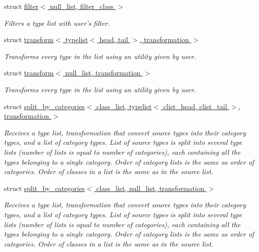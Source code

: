 \begin{DoxyCompactItemize}
struct \hyperlink{structavrpp_1_1typelist_1_1filter_3_01null__list_00_01filter__class_01_4}{filter$<$ null\_\-list, filter\_\-class $>$}
\begin{DoxyCompactList}\small\item\em Filters a type list with user's filter. \item\end{DoxyCompactList}\item 
struct \hyperlink{structavrpp_1_1typelist_1_1transform_3_01typelist_3_01head_00_01tail_01_4_00_01transformation_01_4}{transform$<$ typelist$<$ head, tail $>$, transformation $>$}
\begin{DoxyCompactList}\small\item\em Transforms every type in the list using an utility given by user. \item\end{DoxyCompactList}\item 
struct \hyperlink{structavrpp_1_1typelist_1_1transform_3_01null__list_00_01transformation_01_4}{transform$<$ null\_\-list, transformation $>$}
\begin{DoxyCompactList}\small\item\em Transforms every type in the list using an utility given by user. \item\end{DoxyCompactList}\item 
struct \hyperlink{structavrpp_1_1typelist_1_1split__by__categories_3_01class__list_00_01typelist_3_01clist__head_0fa46119bbacf04c898014ff4be749bde}{split\_\-by\_\-categories$<$ class\_\-list, typelist$<$ clist\_\-head, clist\_\-tail $>$, transformation $>$}
\begin{DoxyCompactList}\small\item\em Receives a type list, transformation that convert source types into their category types, and a list of category types. List of source types is split into several type lists (number of lists is equal to number of categories), each containing all the types belonging to a single category. Order of category lists is the same as order of categories. Order of classes in a list is the same as in the source list. \item\end{DoxyCompactList}\item 
struct \hyperlink{structavrpp_1_1typelist_1_1split__by__categories_3_01class__list_00_01null__list_00_01transformation_01_4}{split\_\-by\_\-categories$<$ class\_\-list, null\_\-list, transformation $>$}
\begin{DoxyCompactList}\small\item\em Receives a type list, transformation that convert source types into their category types, and a list of category types. List of source types is split into several type lists (number of lists is equal to number of categories), each containing all the types belonging to a single category. Order of category lists is the same as order of categories. Order of classes in a list is the same as in the source list. \item\end{DoxyCompactList}\item 

\end{DoxyCompactItemize}
